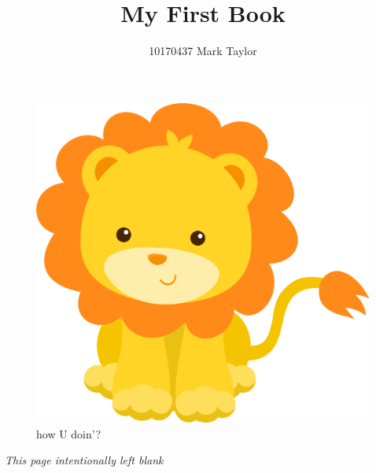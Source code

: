 \documentclass{book}
\begin{document}
	\thispagestyle{empty}
	\begin{figure}
		\centering
		\includegraphics[width=1.0\linewidth]{img/lion}
		\caption*{how U doin'?}
		\label{fig:lion}
	\end{figure}
	\pagecolor{pink}\afterpage{\nopagecolor}
	\clearpage
	\newpage
	
	\begin{center}
		{\LARGE \emph{This page intentionally left blank} }
	\end{center}
	
   
	
	\thispagestyle{empty}	
	\title{My First Book}
	\author{10170437 Mark Taylor}
	\date{}
	\maketitle
	
\end{document}
